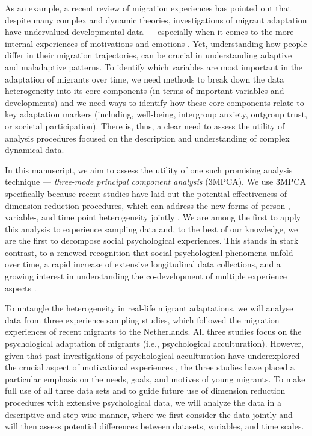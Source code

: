 \documentclass[]{article}
\begin{document}
As an example, a recent review of migration experiences has pointed out
that despite many complex and dynamic theories, investigations of
migrant adaptation have undervalued developmental data --- especially
when it comes to the more internal experiences of motivations and
emotions \citep{Kreienkamp2022d}. Yet, understanding how people differ
in their migration trajectories, can be crucial in understanding
adaptive and maladaptive patterns. To identify which variables are most
important in the adaptation of migrants over time, we need methods to
break down the data heterogeneity into its core components (in terms of
important variables and developments) and we need ways to identify how
these core components relate to key adaptation markers (including,
well-being, intergroup anxiety, outgroup trust, or societal
participation). There is, thus, a clear need to assess the utility of
analysis procedures focused on the description and understanding of
complex dynamical data.

In this manuscript, we aim to assess the utility of one such promising
analysis technique --- \textit{three-mode principal component analysis}
(3MPCA). We use 3MPCA specifically because recent studies have laid out
the potential effectiveness of dimension reduction procedures, which can
address the new forms of person-, variable-, and time point
heterogeneity jointly \citep[e.g.,][]{Monden2015}. We are among the
first to apply this analysis to experience sampling data and, to the
best of our knowledge, we are the first to decompose social
psychological experiences. This stands in stark contrast, to a renewed
recognition that social psychological phenomena unfold over time, a
rapid increase of extensive longitudinal data collections, and a growing
interest in understanding the co-development of multiple experience
aspects
\citep[e.g.,][]{Kreienkamp2022d, MacInnis2015, McKeown2017, Pettigrew2011, Ward2019}.

To untangle the heterogeneity in real-life migrant adaptations, we will
analyse data from three experience sampling studies, which followed the
migration experiences of recent migrants to the Netherlands. All three
studies focus on the psychological adaptation of migrants (i.e.,
psychological acculturation). However, given that past investigations of
psychological acculturation have underexplored the crucial aspect of
motivational experiences \citep{Kreienkamp2022d}, the three studies have
placed a particular emphasis on the needs, goals, and motives of young
migrants. To make full use of all three data sets and to guide future
use of dimension reduction procedures with extensive psychological data,
we will analyze the data in a descriptive and step wise manner, where we
first consider the data jointly and will then assess potential
differences between datasets, variables, and time scales.
\end{document}
